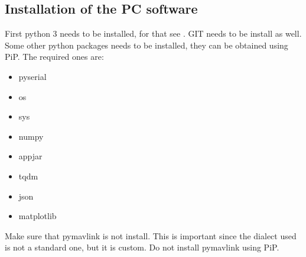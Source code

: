 \documentclass[12pt,a4paper]{article}
\begin{document}
\subsection{Installation of the PC software}\label{sec:install}
First python 3 needs to be installed, for that see \cite{py}. GIT needs to be install as well. Some other python packages needs to be installed, they can be obtained using PiP. The required ones are:\\
\begin{multicols}{3}[]
\begin{itemize}
	\item pyserial
	\item os
	\item sys
	\item numpy
	\item appjar
	\item tqdm
	\item json
	\item matplotlib
\end{itemize}
\end{multicols}

Make sure that pymavlink is not install. This is important since the dialect used is not a standard one, but it is custom. Do not install pymavlink using PiP.\\
\end{document}
